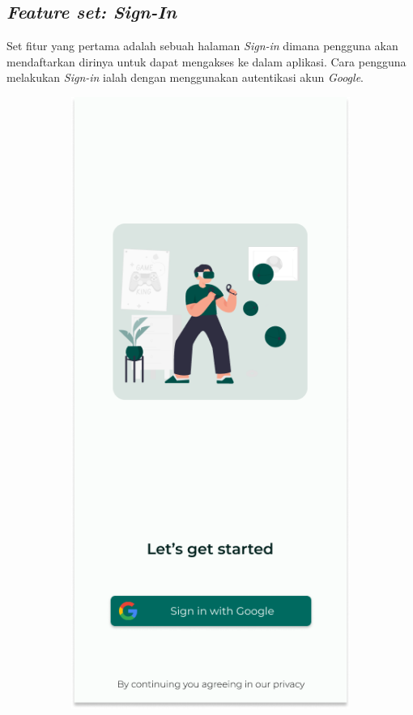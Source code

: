 \subsection{\textit{Feature set: Sign-In}}
Set fitur yang pertama adalah sebuah halaman \textit{Sign-in} dimana pengguna akan mendaftarkan dirinya untuk dapat mengakses ke dalam aplikasi.
Cara pengguna melakukan \textit{Sign-in} ialah dengan menggunakan autentikasi akun \textit{Google}.
\begin{figure}[H]
	\centering
	\begin{subfigure}[b]{0.25\textwidth}
		\centering
	  \includegraphics[width=\linewidth]{contents/chapter-3/images/HF-login.png}

\end{subfigure}
\end{figure}
